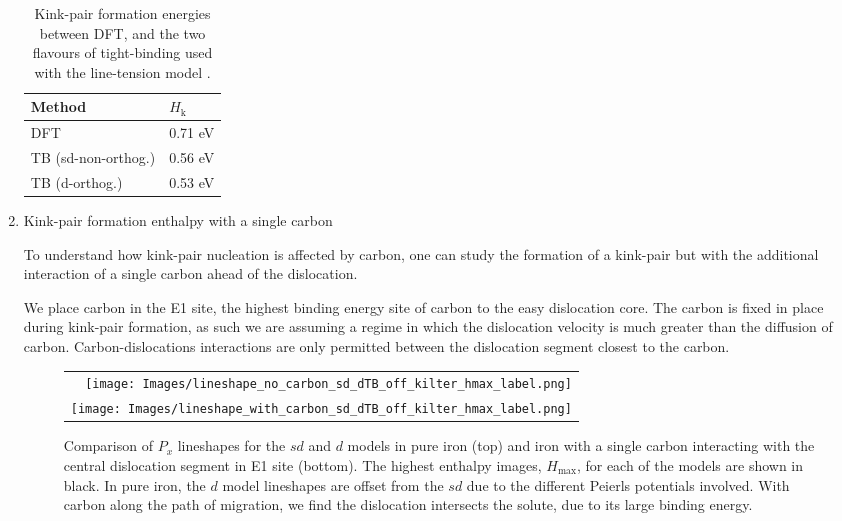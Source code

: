 \documentclass[a4paper,12pt,oneside,print,numbered,index,PageStyleIII]{PhDThesisPSnPDF}
\begin{document}
\begin{enumerate}
\begin{table}[htbp]
\caption{Kink-pair formation energies between DFT, and the two flavours of tight-binding used with the line-tension model \label{kink-pair_formation_enthalpy_pure}.}
\centering
\begin{tabular}{ll}
Method & \(H_{\text{k}}\)\\
\hline
DFT & 0.71 eV\\
TB (sd-non-orthog.) & 0.56 eV\\
TB (d-orthog.) & 0.53 eV\\
\end{tabular}
\end{table}


\item Kink-pair formation enthalpy with a single carbon
\label{sec:orgaacc02e}

To understand how kink-pair nucleation is affected by carbon, one
can study the formation of a kink-pair but with the
additional interaction of a single carbon ahead of the dislocation.

We place carbon in the E1 site, the highest binding energy site of carbon to
the easy dislocation core. The carbon is fixed in place during kink-pair
formation, as such we are assuming a regime in which the dislocation
velocity is much greater than the diffusion of carbon. Carbon-dislocations
interactions are only permitted between the dislocation segment closest to
the carbon.


    \begin{figure}
\centering
	\begin{tabular}{r}
		      \texttt{[image: Images/lineshape\_no\_carbon\_sd\_dTB\_off\_kilter\_hmax\_label.png]} \\
		      \texttt{[image: Images/lineshape\_with\_carbon\_sd\_dTB\_off\_kilter\_hmax\_label.png]}  \\

		 \end{tabular}
    \caption{ Comparison of $P_x$ lineshapes for the $sd$ and $d$ models in pure iron (top) and iron with a single carbon interacting with the central dislocation segment in E1 site (bottom). The highest enthalpy images, $H_{\text{max}}$, for each of the models are shown in black. In pure iron, the $d$ model lineshapes are offset from the $sd$ due to the different Peierls potentials involved. With carbon along the path of migration, we find the dislocation intersects the solute, due to its large binding energy.}
    \label{fig:alllineshapes}
       \end{figure}



\end{enumerate}
\end{document}
